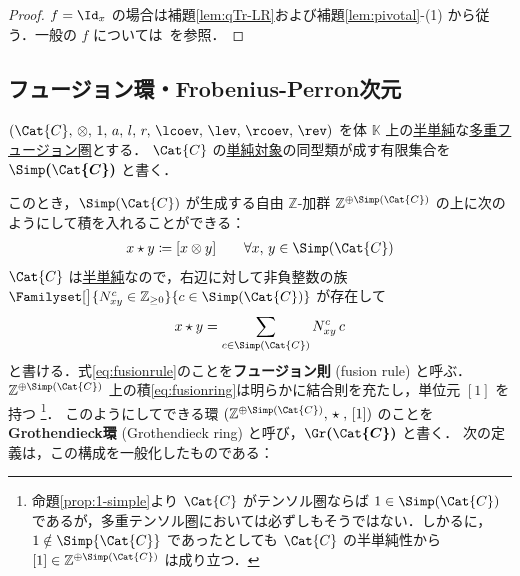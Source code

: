 \documentclass[TQFT_main]{subfiles}
\begin{document}
\begin{proof}
    $f = \Id_x$ の場合は補題\ref{lem:qTr-LR}および補題\ref{lem:pivotal}-(1) から従う．一般の $f$ については~\cite[THEOREM 4.7.15]{etingof2015tensor}を参照．
\end{proof}


\subsection{フュージョン環・Frobenius-Perron次元}

$(\Cat{C},\, \otimes,\, 1,\, a,\, l,\, r,\, \lcoev,\, \lev,\, \rcoev,\, \rev)$ を体 $\mathbb{K}$ 上の\hyperref[def:semisimple-cat]{半単純}な\hyperref[def:tensorfusion-cat]{多重フュージョン圏}とする．
$\Cat{C}$ の\hyperref[def:semisimple-cat]{単純対象}の同型類が成す有限集合を $\bm{\Simp (\Cat{C})}$ と書く．

このとき，$\Simp(\Cat{C})$ が生成する自由 $\mathbb{Z}$-加群 $\mathbb{Z}^{\oplus \Simp(\Cat{C})}$ の上に次のようにして積を入れることができる：
\begin{align}
    \label{eq:fusionring}
    x \star y \coloneqq [x \otimes y]\qquad \forall x,\, y \in \Simp(\Cat{C})
\end{align}
$\Cat{C}$ は\hyperref[def:semisimple-cat]{半単純}なので，右辺に対して非負整数の族 $\Familyset[\big]{N^c_{xy} \in \mathbb{Z}_{\ge 0}}{c \in \Simp(\Cat{C})}$ が存在して
\begin{align}
    \label{eq:fusionrule}
    x \star y = \sum_{c \in \Simp(\Cat{C})} N^c_{xy}\, c
\end{align}
と書ける．式\eqref{eq:fusionrule}のことを\textbf{フュージョン則} (fusion rule) と呼ぶ．
$\mathbb{Z}^{\oplus \Simp(\Cat{C})}$ 上の積\eqref{eq:fusionring}は明らかに結合則を充たし，単位元 $[1]$ を持つ
\footnote{命題\ref{prop:1-simple}より $\Cat{C}$ がテンソル圏ならば $1 \in \Simp(\Cat{C})$ であるが，多重テンソル圏においては必ずしもそうではない．しかるに，$1 \notin \Simp{\Cat{C}}$ であったとしても $\Cat{C}$ の半単純性から $[1] \in \mathbb{Z}^{\oplus \Simp(\Cat{C})}$ は成り立つ．}．
このようにしてできる環 $(\mathbb{Z}^{\oplus \Simp(\Cat{C})},\, \star\; ,\, [1])$ のことを\textbf{Grothendieck環} (Grothendieck ring) と呼び，$\bm{\Gr (\Cat{C})}$ と書く．
次の定義は，この構成を一般化したものである：
\end{document}
